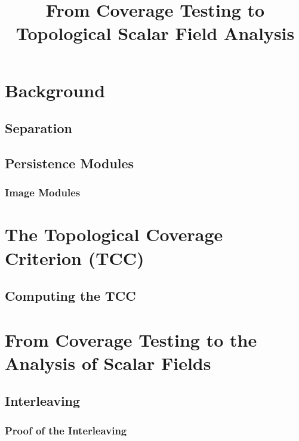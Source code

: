 \documentclass[12pt]{article}
\begin{document}
\title{From Coverage Testing to Topological Scalar Field Analysis}




\section{Background}
\subsection{Separation}
  

\subsection{Persistence Modules}
  

  \subsubsection{Image Modules}
    


\clearpage
\section{The Topological Coverage Criterion (TCC)}


\subsection{Computing the TCC}
  


\clearpage
\section{From Coverage Testing to the Analysis of Scalar Fields}


\subsection{Interleaving}
  

  \subsubsection{Proof of the Interleaving}
    
\end{document}
